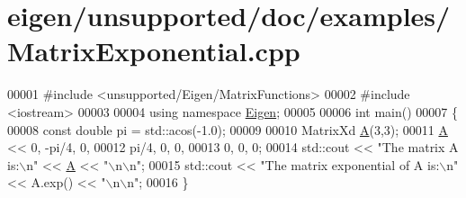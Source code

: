 \hypertarget{eigen_2unsupported_2doc_2examples_2_matrix_exponential_8cpp_source}{}\section{eigen/unsupported/doc/examples/\+Matrix\+Exponential.cpp}
\label{eigen_2unsupported_2doc_2examples_2_matrix_exponential_8cpp_source}

\begin{DoxyCode}
00001 \textcolor{preprocessor}{#include <unsupported/Eigen/MatrixFunctions>}
00002 \textcolor{preprocessor}{#include <iostream>}
00003 
00004 \textcolor{keyword}{using namespace }\hyperlink{namespace_eigen}{Eigen};
00005 
00006 \textcolor{keywordtype}{int} main()
00007 \{
00008   \textcolor{keyword}{const} \textcolor{keywordtype}{double} pi = std::acos(-1.0);
00009 
00010   MatrixXd \hyperlink{group___core___module_class_eigen_1_1_matrix}{A}(3,3);
00011   \hyperlink{group___core___module_class_eigen_1_1_matrix}{A} << 0,    -pi/4, 0,
00012        pi/4, 0,     0,
00013        0,    0,     0;
00014   std::cout << \textcolor{stringliteral}{"The matrix A is:\(\backslash\)n"} << \hyperlink{group___core___module_class_eigen_1_1_matrix}{A} << \textcolor{stringliteral}{"\(\backslash\)n\(\backslash\)n"};
00015   std::cout << \textcolor{stringliteral}{"The matrix exponential of A is:\(\backslash\)n"} << A.exp() << \textcolor{stringliteral}{"\(\backslash\)n\(\backslash\)n"};
00016 \}
\end{DoxyCode}
